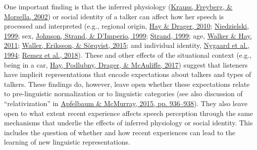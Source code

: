 \documentclass[
  11pt,
  english,
  man,floatsintext]{apa6}
\begin{document}
One important finding is that the inferred physiology (\protect\hyperlink{ref-krauss2002}{Krauss, Freyberg, \& Morsella, 2002}) or social identity of a talker can affect how her speech is processed and interpreted (e.g., regional origin, \protect\hyperlink{ref-hay-drager2010}{Hay \& Drager, 2010}; \protect\hyperlink{ref-niedzielski1999}{Niedzielski, 1999}; sex, \protect\hyperlink{ref-johnson1999}{Johnson, Strand, \& D'Imperio, 1999}; \protect\hyperlink{ref-strand1999}{Strand, 1999}; age, \protect\hyperlink{ref-walker-hay2011}{Walker \& Hay, 2011}; \protect\hyperlink{ref-skoogwaller2015}{Waller, Eriksson, \& Sörqvist, 2015}; and individual identity, \protect\hyperlink{ref-nygaard1994}{Nygaard et al., 1994}; \protect\hyperlink{ref-remez2018}{Remez et al., 2018}). These and other effects of the situational context (e.g., being in a car, \protect\hyperlink{ref-hay2017}{Hay, Podlubny, Drager, \& McAuliffe, 2017}) suggest that listeners have implicit representations that encode expectations about talkers and types of talkers. These findings do, however, leave open whether these expectations relate to pre-linguistic normalization or to linguistic categories (see also discussion of {``relativization''} in \protect\hyperlink{ref-apfelbaum-mcmurray2015}{Apfelbaum \& McMurray, 2015, pp. 936--938}). They also leave open to what extent recent experience affects speech perception through the same mechanisms that underlie the effects of inferred physiology or social identity. This includes the question of whether and how recent experiences can lead to the learning of new linguistic representations.
\end{document}
